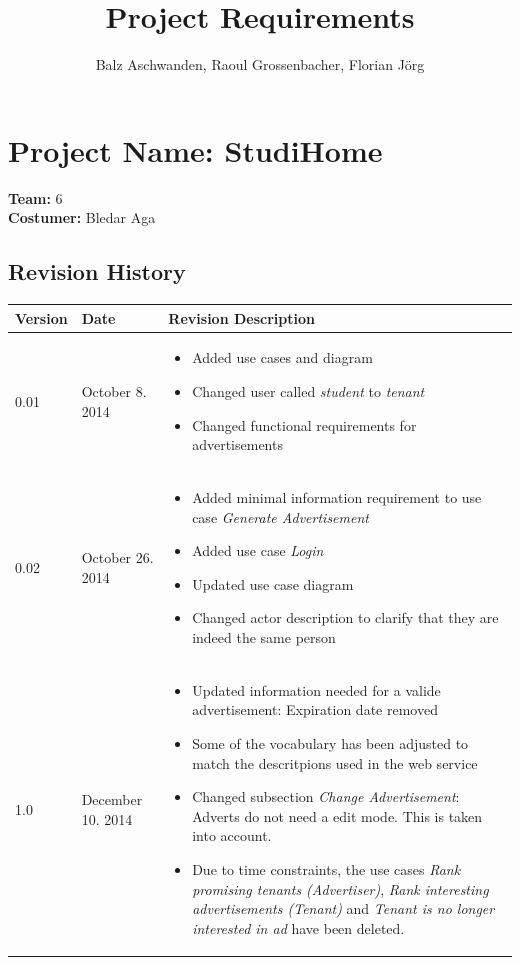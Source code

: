 \documentclass[a4paper,11pt]{article}
\title{Project Requirements}
\author{Balz Aschwanden, Raoul Grossenbacher, Florian Jörg}
\begin{document}
\maketitle
\section*{Project Name: StudiHome}

\textbf{Team:} 6 \\
\textbf{Costumer:} Bledar Aga \\

\subsection*{Revision History}
\begin{tabular}{|p{1.2cm}|p{3cm}|p{8cm}|} \hline
  Version & Date & Revision Description \\ \hline
  0.01 & October 8. 2014 &
  \begin{itemize}
  	\item Added use cases and diagram
  	\item Changed user called \textit{student} to \textit{tenant}
  	\item Changed functional requirements for advertisements
  \end{itemize} \\ \hline
  0.02 & October 26. 2014 & 
  \begin{itemize}
  	\item Added minimal information requirement to use case \textit{Generate Advertisement}
  	\item Added use case \textit{Login}
  	\item Updated use case diagram
  	\item Changed actor description to clarify that they are indeed the same person
  \end{itemize} \\ \hline
  1.0 & December 10. 2014 & 
  \begin{itemize}
    \item Updated information needed for a valide advertisement: Expiration date removed
    \item Some of the vocabulary has been adjusted to match the descritpions used in the web service
    \item Changed subsection \textit{Change Advertisement}: Adverts do not need a edit mode. This is taken into account.
    \item Due to time constraints, the use cases \textit{Rank promising tenants (Advertiser)}, \textit{Rank interesting advertisements (Tenant)} and \textit{Tenant is no longer interested in ad} have been deleted.
  \end{itemize}\\ \hline

\end{tabular}
\end{document}

